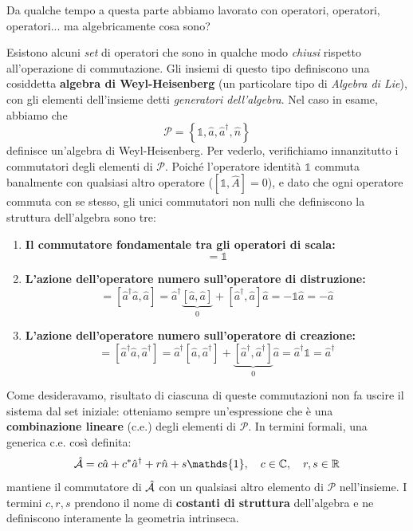 \begin{approfondimento}[title= {L'algebra di Weyl-Heisenberg}]
    Da qualche tempo a questa parte abbiamo lavorato con operatori, operatori, operatori... ma algebricamente cosa sono? 

    Esistono alcuni \emph{set} di operatori che sono in qualche modo \emph{chiusi} rispetto all'operazione di commutazione. Gli insiemi di questo tipo definiscono una cosiddetta \textbf{algebra di Weyl-Heisenberg} (un particolare tipo di \emph{Algebra di Lie}), con gli elementi dell'insieme detti \emph{generatori dell'algebra}. Nel caso in esame, abbiamo che 
    \[
        \mathcal{P} = \left\{ \mathds{1}, \hat{a}, \hat{a}^\dagger, \hat{n} \right\}
    \]
    definisce un'algebra di Weyl-Heisenberg. Per vederlo, verifichiamo innanzitutto i commutatori degli elementi di $\mathcal{P}$. Poiché l'operatore identità $\mathds{1}$ commuta banalmente con qualsiasi altro operatore ($[\mathds{1}, \hat{A}] = 0$), e dato che ogni operatore commuta con se stesso, gli unici commutatori non nulli che definiscono la struttura dell'algebra sono tre:
    
    \begin{enumerate}
        \item \textbf{Il commutatore fondamentale tra gli operatori di scala:}
        \begin{equation}
            [\hat{a}, \hat{a}^\dagger] = \mathds{1}
        \end{equation}
        \item \textbf{L'azione dell'operatore numero sull'operatore di distruzione:}
        \begin{equation}
            [\hat{n}, \hat{a}] = [\hat{a}^\dagger\hat{a}, \hat{a}] = \hat{a}^\dagger \underbrace{[\hat{a}, \hat{a}]}_{0} + [\hat{a}^\dagger, \hat{a}]\hat{a} = -\mathds{1}\hat{a} = -\hat{a}
        \end{equation}
        \item \textbf{L'azione dell'operatore numero sull'operatore di creazione:}
        \begin{equation}
            [\hat{n}, \hat{a}^\dagger] = [\hat{a}^\dagger\hat{a}, \hat{a}^\dagger] = \hat{a}^\dagger [\hat{a}, \hat{a}^\dagger] + \underbrace{[\hat{a}^\dagger, \hat{a}^\dagger]}_{0}\hat{a} = \hat{a}^\dagger\mathds{1} = \hat{a}^\dagger
        \end{equation}
    \end{enumerate}
    Come desideravamo, risultato di ciascuna di queste commutazioni non fa uscire il sistema dal set iniziale: otteniamo sempre un'espressione che è una \textbf{combinazione lineare} (c.e.) degli elementi di $\mathcal{P}$. In termini formali, una generica c.e. così definita:
    \[  
        \h{A} = c\hat{a} + c^* \hat{a}^\dagger + r \hat{n} + s\mathds{1}, \quad c \in \mathbb{C}, \quad r,s \in \mathbb{R}
    \]
    mantiene il commutatore di $\hat{\mathcal{A}}$ con un qualsiasi altro elemento di $\mathcal{P}$ nell'insieme. I termini $c, r, s$ prendono il nome di \textbf{costanti di struttura} dell'algebra e ne definiscono interamente la geometria intrinseca. 


\end{approfondimento}
